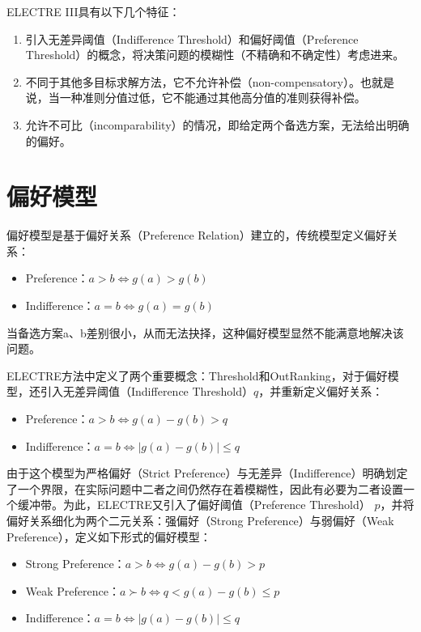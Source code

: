 ELECTRE III具有以下几个特征：
\begin{enumerate}[（1）]
  \item 引入无差异阈值（Indifference Threshold）和偏好阈值（Preference Threshold）的概念，将决策问题的模糊性（不精确和不确定性）考虑进来。
  \item 不同于其他多目标求解方法，它不允许补偿（non-compensatory）。也就是说，当一种准则分值过低，它不能通过其他高分值的准则获得补偿。
  \item 允许不可比（incomparability）的情况，即给定两个备选方案，无法给出明确的偏好。
\end{enumerate}

\section{偏好模型}
偏好模型是基于偏好关系（Preference Relation）建立的，传统模型定义偏好关系：
\begin{itemize}
  \item Preference：$a>b \Leftrightarrow g(a)>g(b)$
  \item Indifference：$a=b \Leftrightarrow g(a)=g(b)$
\end{itemize}
当备选方案a、b差别很小，从而无法抉择，这种偏好模型显然不能满意地解决该问题。

ELECTRE方法中定义了两个重要概念：Threshold和OutRanking，对于偏好模型，还引入无差异阈值（Indifference Threshold）$q$，并重新定义偏好关系：
\begin{itemize}
  \item Preference：$a>b \Leftrightarrow g(a)- g(b) > q$
  \item Indifference：$a=b \Leftrightarrow |g(a)-g(b)|\le q$
\end{itemize}

由于这个模型为严格偏好（Strict Preference）与无差异（Indifference）明确划定了一个界限，在实际问题中二者之间仍然存在着模糊性，因此有必要为二者设置一个缓冲带。为此，ELECTRE又引入了偏好阈值（Preference Threshold） $p$，并将偏好关系细化为两个二元关系：强偏好（Strong Preference）与弱偏好（Weak Preference），定义如下形式的偏好模型：
\begin{itemize}
  \item Strong Preference：$a>b \Leftrightarrow g(a)-g(b)>p$
  \item Weak Preference：$a\succ b \Leftrightarrow q<g(a)-g(b)\le p$
  \item Indifference：$a=b \Leftrightarrow |g(a)-g(b)|\le q$
\end{itemize}

